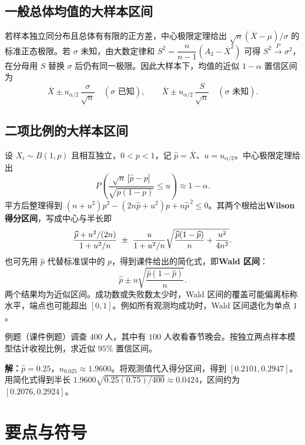 \documentclass[UTF8,fontset=none,zihao=-4,a4paper]{ctexart}
\newcommand{\term}[1]{\textbf{#1}}
\newcommand{\example}[1]{\begin{infobox}{例题}#1\end{infobox}}
\newcommand{\solution}{\par\noindent\textbf{解：}}
\newcommand{\chapterpage}[1]{\clearpage\section{#1}}
\renewcommand{\arraystretch}{1.3}
\begin{document}
\subsection{一般总体均值的大样本区间}
若样本独立同分布且总体有有限的正方差，中心极限定理给出 $\sqrt n(\overline X-\mu)/\sigma$ 的标准正态极限。若 $\sigma$ 未知，由大数定律和 $S^2=\dfrac{n}{n-1}(A_2-\overline X^2)$ 可得 $S^2\xrightarrow{P}\sigma^2$，在分母用 $S$ 替换 $\sigma$ 后仍有同一极限。因此大样本下，均值的近似 $1-\alpha$ 置信区间为
\[
\overline X\pm u_{\alpha/2}\,\frac{\sigma}{\sqrt n}\quad(\sigma\text{ 已知}),\qquad
\overline X\pm u_{\alpha/2}\,\frac{S}{\sqrt n}\quad(\sigma\text{ 未知}).
\]

\subsection{二项比例的大样本区间}
设 $X_i\sim B(1,p)$ 且相互独立，$0<p<1$，记 $\widehat p=\overline X$、$u=u_{\alpha/2}$。中心极限定理给出
\[
P\!\left(\frac{\sqrt n\,|\widehat p-p|}{\sqrt{p(1-p)}}\le u\right)\approx1-\alpha .
\]
平方后整理得到 $(n+u^2)p^2-(2n\widehat p+u^2)p+n\widehat p^{\,2}\le0$。其两个根给出\term{Wilson 得分区间}，写成中心与半长即
\[
\frac{\widehat p+u^2/(2n)}{1+u^2/n}
\ \pm\ \relax
\frac{u}{1+u^2/n}\sqrt{\frac{\widehat p(1-\widehat p)}{n}+\frac{u^2}{4n^2}}.
\]
也可先用 $\widehat p$ 代替标准误中的 $p$，得到课件给出的简化式，即\term{Wald 区间}：
\[
\widehat p\pm u\sqrt{\frac{\widehat p(1-\widehat p)}{n}}.
\]
两个结果均为近似区间。成功数或失败数太少时，Wald 区间的覆盖可能偏离标称水平，端点也可能超出 $[0,1]$。例如所有观测均成功时，Wald 区间退化为单点 $1$。

\example{（课件例题）调查 $400$ 人，其中有 $100$ 人收看春节晚会。按独立两点样本模型估计收视比例，求近似 $95\%$ 置信区间。}
\solution $\widehat p=0.25$，$u_{0.025}\approx1.9600$。将观测值代入得分区间，得到 $[0.2101,0.2947]$。用简化式得到半长 $1.9600\sqrt{0.25(0.75)/400}\approx0.0424$，区间约为 $[0.2076,0.2924]$。

\chapterpage{要点与符号}
\renewcommand{\arraystretch}{1.15}
\end{document}
